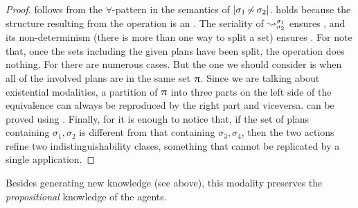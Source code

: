 \begin{proof}
 follows from the $\forall$-pattern in the semantics of $[{\sigma_1{\,\not\sim\,}\sigma_2}]$.
 holds because the structure resulting from the operation is an \ults.
The seriality of $\leadsto^{\sigma_1}_{\sigma_2}$ ensures , and its non-determinism (there is more than one way to split a set) ensures .
For  note that, once the sets including the given plans have been split, the operation does nothing. %
For  there are numerous cases. But the one we should consider is when all of the involved plans are in the same set $\uppi$. Since we are talking about existential modalities, a partition of $\uppi$ into three parts on the left side of the equivalence can always be reproduced by the right part and viceversa. %
 can be proved using . Finally, for  it is enough to notice that, if the set of plans containing $\sigma_1, \sigma_2$ is different from that containing $\sigma_3, \sigma_4$, then the two actions refine two indistinguishability clases, something that cannot be replicated by a single application.
\end{proof}

Besides generating new knowledge (see above), this modality preserves the \emph{propositional} knowledge of the agents.

\medskip


